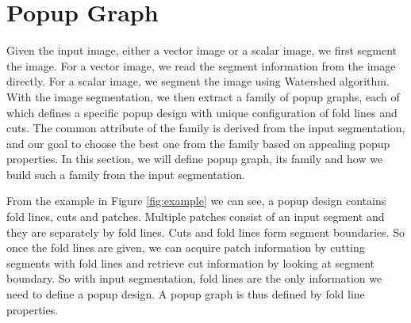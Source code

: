 \section{Popup Graph}
Given the input image, either a vector image or a scalar image, we first segment the image. For a vector image, we read the segment information from the image directly. For a scalar image, we segment the image using Watershed algorithm. With the image segmentation, we then extract a family of popup graphs, each of which defines a specific popup design with unique configuration of fold lines and cuts. The common attribute of the family is derived from the input segmentation, and our goal to choose the best one from the family based on appealing popup properties. In this section, we will define popup graph, its family and how we build such a family from the input segmentation.

From the example in Figure \ref{fig:example} we can see, a popup design contains fold lines, cuts and patches. Multiple patches consist of an input segment and they are separately by fold lines. Cuts and fold lines form segment boundaries. So once the fold lines are given, we can acquire patch information by cutting segments with fold lines and retrieve cut information by looking at segment boundary. So with input segmentation, fold lines are the only information we need to define a popup design. A popup graph is thus defined by fold line properties.

